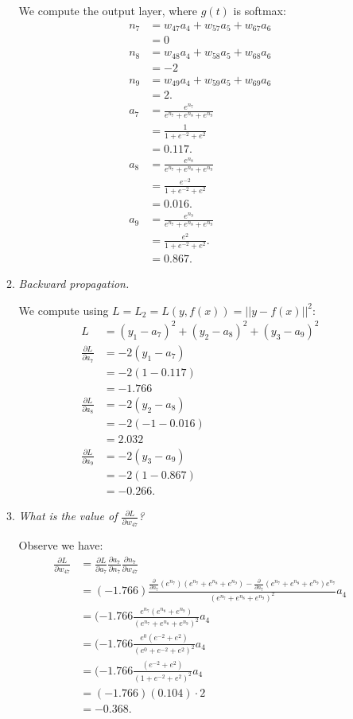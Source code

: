 \documentclass[12pt,oneside,reqno]{amsart}
\theoremstyle{plain}
\theoremstyle{definition}
\theoremstyle{remark}
\newcommand{\bee}{\begin{equation}\begin{aligned}}
\newcommand{\eee}{\end{aligned}\end{equation}}
\newcommand{\fracc}{\frac}
\newcommand{\lpar}{\left(}
\newcommand{\rpar}{\right)}
\begin{document}
\begin{enumerate}[label=\arabic*.]
\begin{enumerate}
We compute the output layer, where $g(t)$ is softmax:
\bee
n_7 &=  w_{47}a_4 + w_{57}a_5 + w_{67}a_6  \\
&= 0\\
n_8 &= w_{48}a_4 + w_{58}a_5 + w_{68}a_6  \\
&= -2\\
n_9 &= w_{49}a_4 + w_{59}a_5 + w_{69}a_6  \\
&= 2.\\
a_7 &= \fracc{e^{n_7}}{e^{n_7} + e^{n_8} + e^{n_9}}\\
&= \fracc{1}{1 + e^{-2} + e^2}\\
&= 0.117.\\
a_8 &=  \fracc{e^{n_8}}{e^{n_7} + e^{n_8} + e^{n_9}}\\
&= \fracc{e^{-2}}{1 + e^{-2} + e^2}\\
&= 0.016.\\
a_9 &= \fracc{e^{n_9}}{e^{n_7} + e^{n_8} + e^{n_9}}\\
&= \fracc{e^{2}}{1 + e^{-2} + e^2}.\\
&= 0.867.
\eee

\item \textit{Backward propagation. }


We compute using $L = L_2 = L(y,f(x)) = ||y - f(x)||^2$:
\bee
L &= (y_1 - a_7)^2 + (y_2 - a_8)^2 + (y_3 - a_9)^2\\
\fracc{\partial L}{\partial a_7} &= -2(y_1 - a_7)\\
&= -2(1 - 0.117)\\
&= -1.766\\
\fracc{\partial L}{\partial a_8} &= -2(y_2 - a_8)\\
&= -2(-1 - 0.016)\\
&=2.032\\
\fracc{\partial L}{\partial a_9} &= -2(y_3 - a_9)\\
&= -2(1 - 0.867)\\
&= -0.266.
\eee

\item \textit{What is the value of $\fracc{\partial L}{\partial w_{47}}$?}

Observe we have:
\bee
\fracc{\partial L}{\partial w_{47}} &= \fracc{\partial L}{\partial a_7}\fracc{\partial a_7}{\partial n_7}\fracc{\partial n_7}{\partial w_{47}}\\
&= (-1.766)\fracc{\fracc{\partial}{\partial n_7}\lpar e^{n_7} \rpar \lpar e^{n_7} + e^{n_8} + e^{n_9} \rpar  - \fracc{\partial}{\partial n_7}\lpar e^{n_7} + e^{n_8} + e^{n_9} \rpar e^{n_7}}{\lpar e^{n_7} + e^{n_8} + e^{n_9} \rpar ^2} a_4\\
&= (-1.766\fracc{e^{n_7}\lpar e^{n_8} + e^{n_9} \rpar }{\lpar e^{n_7} + e^{n_8} + e^{n_9} \rpar ^2} a_4\\
&= (-1.766\fracc{e^{0}\lpar e^{-2} + e^{2} \rpar }{\lpar e^{0} + e^{-2} + e^{2} \rpar ^2} a_4\\
&= (-1.766\fracc{\lpar e^{-2} + e^{2} \rpar }{\lpar 1 + e^{-2} + e^{2} \rpar ^2} a_4\\
&= (-1.766)(0.104)\cdot 2\\
&= -0.368.
\eee


\end{enumerate}
\end{enumerate}
\end{document}
